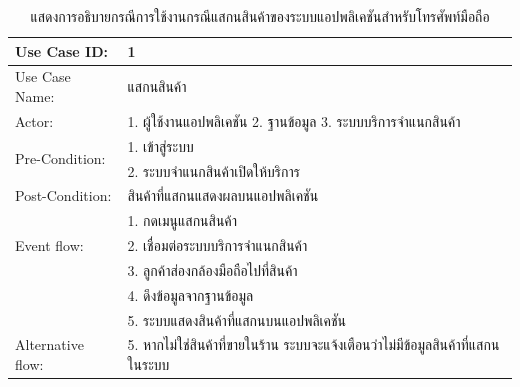 \begin{table}[htbp]
  \centering
  \caption{แสดงการอธิบายกรณีการใช้งานกรณีแสกนสินค้าของระบบแอปพลิเคชันสำหรับโทรศัพท์มือถือ}
  \begin{tabularx}{\textwidth}{|p{3cm}|X|}
    \hline
    \multirow{1}{3cm}{Use Case ID:}      & 1                                                             \\
    \hline
    \multirow{1}{3cm}{Use Case Name:}    & แสกนสินค้า                                                      \\
    \hline
    \multirow{1}{3cm}{Actor:}            & 1. ผู้ใช้งานแอปพลิเคชัน 2. ฐานข้อมูล 3. ระบบบริการจำแนกสินค้า            \\
    \hline
    \multirow{2}{3cm}{Pre-Condition:}    & 1. เข้าสู่ระบบ                                                   \\ & 2. ระบบจำแนกสินค้าเปิดให้บริการ\\
    \hline
    \multirow{1}{3cm}{Post-Condition:}   & สินค้าที่แสกนแสดงผลบนแอปพลิเคชัน                                    \\
    \hline
    \multirow{3}{3cm}{Event flow:}       & 1. กดเมนูแสกนสินค้า                                              \\
                                         & 2. เชื่อมต่อระบบบริการจำแนกสินค้า                                    \\ & 3.  ลูกค้าส่องกล้องมือถือไปที่สินค้า \\
                                         & 4. ดึงข้อมูลจากฐานข้อมูล                                           \\
                                         & 5. ระบบแสดงสินค้าที่แสกนบนแอปพลิเคชัน                               \\
    \hline
    \multirow{1}{3cm}{Alternative flow:} & 5. หากไม่ใช่สินค้าที่ขายในร้าน ระบบจะแจ้งเตือนว่าไม่มีข้อมูลสินค้าที่แสกนในระบบ \\
    \hline
  \end{tabularx}
\end{table}

